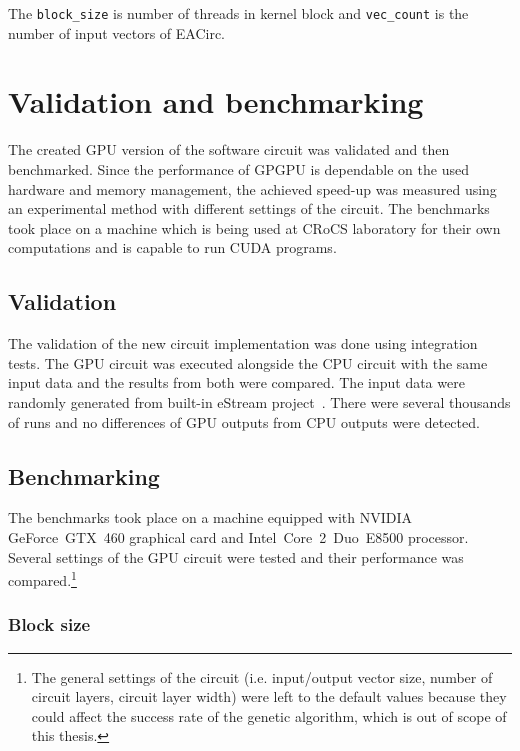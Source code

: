 \documentclass[12pt,twoside]{fithesis2}
\begin{document}
\noindent
The \texttt{block\_size} is number of threads in kernel block and \texttt{vec\_count} is the number of input vectors of EACirc.

\chapter{Validation and benchmarking}

The created GPU version of the software circuit was validated and then benchmarked. Since the performance of GPGPU is dependable on the used hardware and memory management, the achieved speed-up was measured using an experimental method with different settings of the circuit. The benchmarks took place on a machine which is being used at CRoCS laboratory for their own computations and is capable to run CUDA programs.

\section{Validation}

The validation of the new circuit implementation was done using integration tests. The GPU circuit was executed alongside the CPU circuit with the same input data and the results from both were compared. The input data were randomly generated from built-in eStream project~\cite{ukrop_thesis}. There were several thousands of runs and no differences of GPU outputs from CPU outputs were detected.

\section{Benchmarking}

The benchmarks took place on a machine equipped with NVIDIA GeForce~GTX~460 graphical card and Intel\textregistered\ Core\texttrademark~2~Duo~E8500 processor. Several settings of the GPU circuit were tested and their performance was compared.\footnote{The general settings of the circuit (i.e. input/output vector size, number of circuit layers, circuit layer width) were left to the default values because they could affect the success rate of the genetic algorithm, which is out of scope of this thesis.}

\subsection{Block size}
\end{document}
